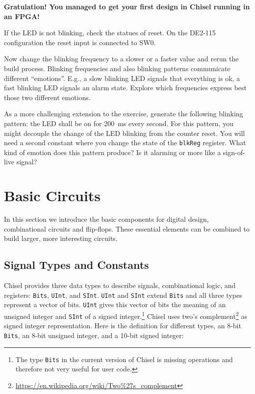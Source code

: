 \documentclass[%
    10pt,
    headinclude, footexclude,
    openright, %
    notitlepage,
    cleardoubleempty,
    headsepline,
    pointlessnumbers,
    bibtotoc, idxtotoc,
    ]{scrbook}
\newcommand{\code}[1]{{\small{\texttt{#1}}}}
\newcommand{\codefoot}[1]{{\footnotesize{\texttt{#1}}}}
\newcommand{\myref}[2]{\href{#1}{#2}}
\renewcommand{\myref}[2]{{#2}{\footnote{\url{#1}}}}
\begin{document}
{\bf Gratulation! You managed to get your first design in Chisel running in an FPGA!}

If the LED is not blinking, check the statues of reset. On the DE2-115 configuration
the reset input is connected to SW0.

Now change the blinking frequency to a slower or a faster value and
rerun the build process. Blinking frequencies and also blinking patterns
communicate different ``emotions''. E.g., a slow blinking LED signals that
everything is ok, a fast blinking LED signals an alarm state.
Explore which frequencies express best those two different emotions.

As a more challenging extension to the exercise, generate the following blinking pattern:
the LED shall be on for 200~ms every second. For this pattern, you might
decouple the change of the LED blinking from the counter reset.
You will need a second constant where you change the state of the
\code{blkReg} register. What kind of emotion does this pattern produce?
Is it alarming or more like a sign-of-live signal?




\chapter{Basic Circuits}

In this section we introduce the basic components for digital design,
combinational circuits and flip-flops.
These essential elements can be combined to build larger, more interesting circuits.

\section{Signal Types and Constants}

Chisel provides three data types to describe signals, combinational logic, and registers:
\code{Bits}, \code{UInt}, and \code{SInt}. \code{UInt} and \code{SInt} extend \code{Bits}
and all three types represent a vector of bits. \code{UInt} gives this vector of
bits the meaning of an unsigned integer and \code{SInt} of a signed
integer.\footnote{The type \codefoot{Bits} in the current version of Chisel is missing operations and
therefore not very useful for user code.}
Chisel uses \myref{https://en.wikipedia.org/wiki/Two\%27s\_complement}{two's complement}
as signed integer representation.
Here is the definition for different types, an 8-bit \code{Bits}, an 8-bit unsigned integer, and a 10-bit
signed integer:
\end{document}
